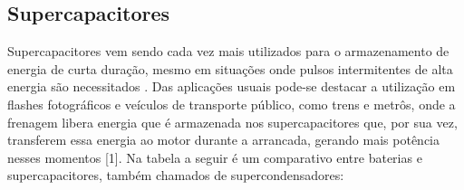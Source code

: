 \subsection{Supercapacitores}
Supercapacitores vem sendo cada vez mais utilizados para o armazenamento de energia de curta duração, mesmo em situações onde pulsos intermitentes de alta energia são necessitados \cite{supercampos}.
Das aplicações usuais pode-se destacar a utilização em flashes fotográficos e veículos de transporte público, como trens e metrôs, onde a frenagem libera energia que é armazenada nos supercapacitores que, por sua vez, transferem essa energia ao motor durante a arrancada, gerando  mais potência nesses momentos [1].
Na tabela a seguir é um comparativo entre baterias e supercapacitores, também chamados de supercondensadores: 


